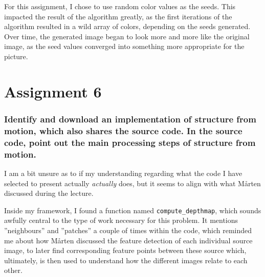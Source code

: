 \documentclass[a4paper, titlepage,12pt]{article}
\begin{document}
For this assignment, I chose to use random color values as the seeds. This impacted the result of the algorithm greatly, as the first iterations of the algorithm resulted in a wild array of colors, depending on the seeds generated. Over time, the generated image began to look more and more like the original image, as the seed values converged into something more appropriate for the picture.

\section*{Assignment 6}
	\subsubsection*{Identify and download an implementation of structure from motion, which also shares the source code. In the source code, point out the main processing steps of structure from motion.}

	I am a bit unsure as to if my understanding regarding what the code I have selected to present actually \emph{actually} does, but it seems to align with what Mårten discussed during the lecture.

	Inside my framework, I found a function named \lstinline{compute_depthmap}, which sounds awfully central to the type of work necessary for this problem. It mentions ''neighbours'' and ''patches'' a couple of times within the code, which reminded me about how Mårten discussed the feature detection of each individual source image, to later find corresponding feature points between these source which, ultimately, is then used to understand how the different images relate to each other.
\end{document}
